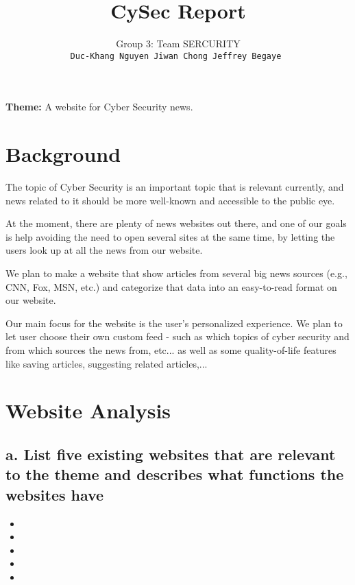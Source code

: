 \documentclass{article}
\title{CySec Report}
\author{
Group 3: Team SERCURITY\\
\texttt{Duc-Khang Nguyen \hspace{0.3in} Jiwan Chong \hspace{0.3in} Jeffrey Begaye }
}
\begin{document}
\maketitle

\textbf{Theme:} A website for Cyber Security news.

\section{Background}

The topic of Cyber Security is an important topic that is relevant currently, and news related to it should be more well-known and accessible to the public eye.

At the moment, there are plenty of news websites out there, and one of our goals is help avoiding the need to open several sites at the same time, by letting the users look up at all the news from our website. 

We plan to make a website that show articles from several big news sources (e.g., CNN, Fox, MSN, etc.) and categorize that data into an easy-to-read format on our website. 

Our main focus for the website is the user's personalized experience. We plan to let user choose their own custom feed - such as which topics of cyber security and from which sources the news from, etc... as well as some quality-of-life features like saving articles, suggesting related articles,...


\section{Website Analysis}

\subsection{a. List five existing websites that are relevant to the theme and describes what functions the websites have}
\begin{itemize}
    \item %
    
    \item %
    
    \item %
    
    \item %
    
    \item %
    
\end{itemize}
\end{document}
